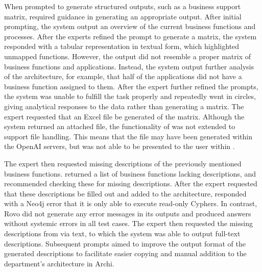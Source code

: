 When prompted to generate structured outputs, such as a business support matrix, \prototype{} required guidance in generating an appropriate output. After initial prompting, the system output an overview of the current business functions and processes. After the experts refined the prompt to generate a matrix, the system responded with a tabular representation in textual form, which highlighted unmapped functions. However, the output did not resemble a proper matrix of business functions and applications. Instead, the system output further analysis of the architecture, for example, that half of the applications did not have a business function assigned to them. After the expert further refined the prompts, the system was unable to fulfill the task properly and repeatedly went in circles, giving analytical responses to the data rather than generating a matrix. The expert requested that an Excel file be generated of the matrix. Although the system returned an attached file, the functionality of \prototype{} was not extended to support file handling. This means that the file may have been generated within the OpenAI servers, but was not able to be presented to the user within \prototype{}. %

The expert then requested missing descriptions of the previously mentioned business functions. \prototype{} returned a list of business functions lacking descriptions, and recommended checking these for missing descriptions. After the expert requested that these descriptions be filled out and added to the architecture, \prototype{} responded with a Neo4j error that it is only able to execute read-only Cyphers. In contrast, Rovo did not generate any error messages in its outputs and produced answers without systemic errors in all test cases. The expert then requested the missing descriptions from \prototype{} via text, to which the system was able to output full-text descriptions. Subsequent prompts aimed to improve the output format of the generated descriptions to facilitate easier copying and manual addition to the department's architecture in Archi. %

